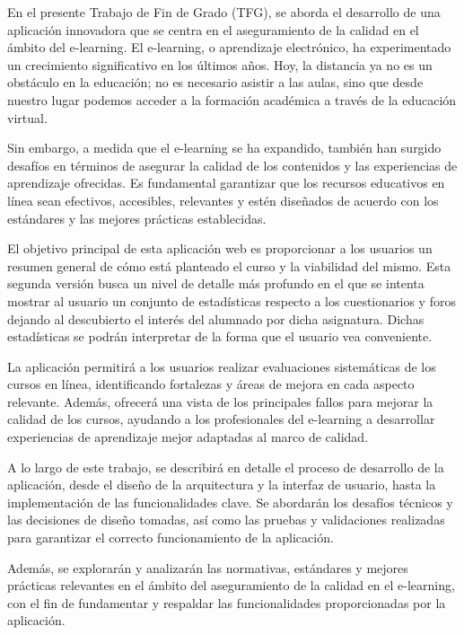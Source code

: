 
En el presente Trabajo de Fin de Grado (TFG), se aborda el desarrollo de una aplicación innovadora que se centra en el aseguramiento de la calidad en el ámbito del e-learning. El e-learning, o aprendizaje electrónico, ha experimentado un crecimiento significativo en los últimos años. Hoy, la distancia ya no es un obstáculo en la educación; no es necesario asistir a las aulas, sino que desde nuestro lugar podemos acceder a la formación académica a través de la educación virtual\cite{educacionvirtual2023}.

Sin embargo, a medida que el e-learning se ha expandido, también han surgido desafíos en términos de asegurar la calidad de los contenidos y las experiencias de aprendizaje ofrecidas. Es fundamental garantizar que los recursos educativos en línea sean efectivos, accesibles, relevantes y estén diseñados de acuerdo con los estándares y las mejores prácticas establecidas\cite{buenaspracticas2017}.

El objetivo principal de esta aplicación web es proporcionar a los usuarios un resumen general de cómo está planteado el curso y la viabilidad del mismo. Esta segunda versión busca un nivel de detalle más profundo en el que se intenta mostrar al usuario un conjunto de estadísticas respecto a los cuestionarios y foros dejando al descubierto el interés del alumnado por dicha asignatura. Dichas estadísticas se podrán interpretar de la forma que el usuario vea conveniente. 

La aplicación permitirá a los usuarios realizar evaluaciones sistemáticas de los cursos en línea, identificando fortalezas y áreas de mejora en cada aspecto relevante. Además, ofrecerá una vista de los principales fallos para mejorar la calidad de los cursos, ayudando a los profesionales del e-learning a desarrollar experiencias de aprendizaje mejor adaptadas al marco de calidad.

A lo largo de este trabajo, se describirá en detalle el proceso de desarrollo de la aplicación, desde el diseño de la arquitectura y la interfaz de usuario, hasta la implementación de las funcionalidades clave. Se abordarán los desafíos técnicos y las decisiones de diseño tomadas, así como las pruebas y validaciones realizadas para garantizar el correcto funcionamiento de la aplicación.

Además, se explorarán y analizarán las normativas, estándares y mejores prácticas relevantes en el ámbito del aseguramiento de la calidad en el e-learning, con el fin de fundamentar y respaldar las funcionalidades proporcionadas por la aplicación.